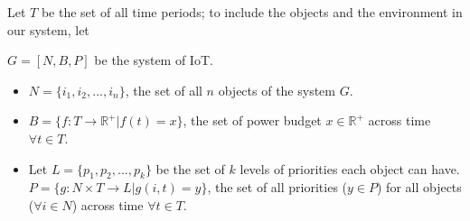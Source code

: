 \documentclass[../main/Self-Stabilization.tex]{subfiles}
\begin{document}
Let $T$ be the set of all time periods; to include the objects and the environment in our system, let
\begin{center}
$G = [N, B, P]$ be the system of IoT.
\end{center} 
\begin{itemize}
  \item $N=\{i_{1}, i_{2}, ...,i_{n}\}$, the set of all $n$ objects of the system $G$.
  \item $B=\{f:T\rightarrow\mathbb{R^+} | f(t)=x\}$, the set of power budget $x \in \mathbb{R^+}$ across time $\forall t \in T$.
  \item Let $L=\{p_{1}, p_{2}, ...,p_{k}\}$ be the set of $k$ levels of priorities each object can have. $P=\{g:N \times T\rightarrow L | g(i, t)=y\}$, the set of all priorities ($y \in P$) for all objects ($\forall i \in N$) across time $\forall t \in T$.
\end{itemize}
\end{document}
